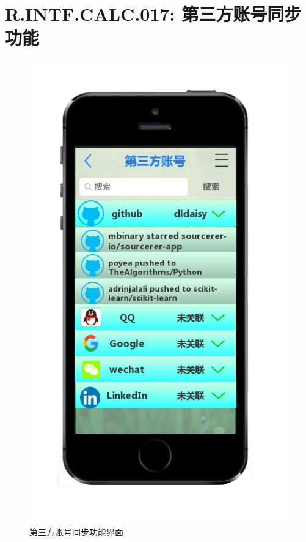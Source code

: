     \section{\color{red}R.INTF.CALC.017: 第三方账号同步功能}
    \begin{figure}[h]
        \centering
        \includegraphics[scale=0.6]{OutlineDesign/figures/第三方账号同步功能界面.png}
        \caption{\color{red}第三方账号同步功能界面}
        \label{fig:server_flow}
    \end{figure}
    \newpage
    